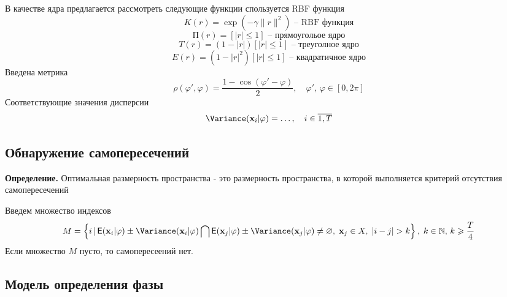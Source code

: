 \documentclass[12pt, twoside]{article}
\theoremstyle{definition}
\def\NN{\mathbb N}
\begin{document}
В качестве ядра предлагается рассмотреть следующие функции спользуется RBF функция
    \[ K(r)= \exp\left(-\gamma\| r \|^2\right) \text{ -- RBF функция}\]
       \[\text{П}(r) = [|r|\leq 1] \text{ -- прямоугольое ядро}\]
      \[ T(r) = (1 - |r|)[|r|\leq 1] \text{ -- треуголное ядро}\]
      \[ E(r) = (1 - |r|^2)[|r|\leq 1] \text{ -- квадратичное ядро}\]
Введена метрика
    \[ \rho(\varphi', \varphi) = \frac{1 - \cos(\varphi' - \varphi)}{2}, \quad \varphi',\, \varphi \in [0, 2\pi]\]
Соответствующие значения дисперсии
    \[  \Variance(\mathbf{x}_i|\varphi) = \dots, \quad i\in \overline{1, T}  \]

\subsection{Обнаружение самопересечений}
 \textbf{Определение.}
 Оптимальная размерность пространства - это размерность пространства, в которой выполняется критерий
отсутствия самопересечений 
 
Введем множество индексов
    \[ M = \left\{ i\,|\, \Expect(\mathbf{x}_i|\varphi)\pm\Variance(\mathbf{x}_i|\varphi)\bigcap\Expect(\mathbf{x}_j|\varphi)\pm\Variance(\mathbf{x}_j|\varphi)\neq\varnothing, \; \mathbf{x}_j\in X,\; |i - j| > k
    \right\},\;k\in\NN, \, k\geq \frac{T}{4} \]
Если множество $M$ пусто, то самопересеений нет. 

\subsection{Модель определения фазы}




\end{document}
